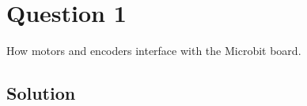 \section*{Question 1}

How motors and encoders interface with the Microbit board.

\subsection*{Solution}
